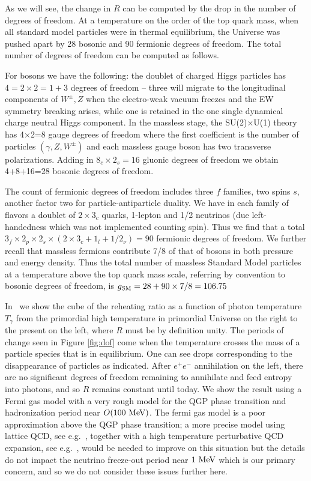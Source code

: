As we will see, the change in $R$ can be computed by the drop in the number of degrees of freedom. At a temperature on the order of the top quark mass, when all standard model particles were in thermal equilibrium, the Universe was pushed apart by 28 bosonic and 90 fermionic degrees of freedom. The total number of degrees of freedom can be computed as follows. 

For bosons we have the following: the doublet of charged Higgs particles has $4=2\times2=1+3$ degrees of freedom -- three will migrate to the longitudinal components of $W^\pm, Z$ when the electro-weak vacuum freezes and the EW symmetry breaking arises, while one is retained in the one single dynamical charge neutral Higgs component. In the massless stage, the SU(2)$\times$U(1) theory has 4$\times$2=8 gauge degrees of freedom where the first coefficient is the number of particles $(\gamma, Z, W^\pm)$ and each massless gauge boson has two transverse polarizations. Adding in $8_c\times2_s=16$ gluonic degrees of freedom we obtain 4+8+16=28 bosonic degrees of freedom. 

The count of fermionic degrees of freedom includes three $f$ families, two spins $s$, another factor two for particle-antiparticle duality. We have in each family of flavors a doublet of $2\times 3_c$ quarks, 1-lepton and 1/2 neutrinos (due left-handedness which was not implemented counting spin). Thus we find that a total $3_f\times 2_p\times 2_s\times(2\times 3_c+1_l+1/2_\nu)=90$ fermionic degrees of freedom. We further recall that massless fermions contribute 7/8 of that of bosons in both pressure and energy density. Thus the total number of massless Standard Model particles at a temperature above the top quark mass scale, referring by convention to bosonic degrees of freedom, is $g_{\rm SM}=28+90\times 7/8=106.75$ 



In~ we show the cube of the reheating ratio  as a function of photon temperature $T_\gamma$ from the primordial high temperature in primordial Universe on the right to the present on the left, where $R$ must be by definition unity. The periods of change seen in Figure \ref{fig:dof} come when the temperature crosses the mass of a particle species that is in equilibrium. One can see drops corresponding to the disappearance of particles as indicated. After $e^+e^-$ annihilation on the left, there are no significant degrees of freedom remaining to annihilate and feed entropy into photons, and so $R$ remains constant until today. We show the result using a Fermi gas model with a very rough model for the QGP phase transition and hadronization period near $O(100\text{ MeV})$. The fermi gas model is a poor approximation above the QGP phase transition; a more precise model using lattice QCD, see e.g.~\cite{Borsanyi:2013bia}, together with a high temperature perturbative QCD expansion, see e.g.~\cite{Letessier:2002ony}, would be needed to improve on this situation but the details do not impact the neutrino freeze-out period near $1\text{ MeV}$ which is our primary concern, and so we do not consider these issues further here.

